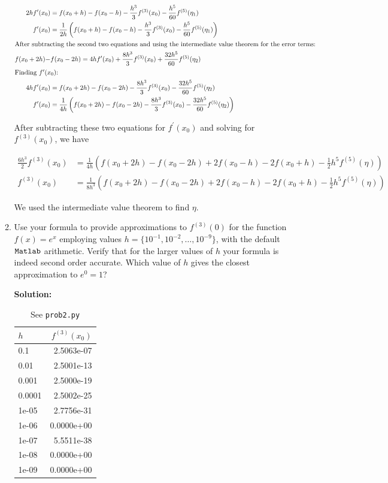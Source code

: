 \documentclass[12pt]{article}
\begin{document}
\begin{enumerate}
\begin{enumerate}
\begin{align*}
2hf^{\prime}(x_{0}) &= f(x_{0} + h) - f(x_{0} - h) - \frac{h^{3}}{3}f^{(3)}(x_{0}) - \frac{h^{5}}{60}f^{(5)}(\eta_{1})\\
f^{\prime}(x_{0}) &= \frac{1}{2h}\left( f(x_{0} + h) - f(x_{0} - h) - \frac{h^{3}}{3}f^{(3)}(x_{0}) - \frac{h^{5}}{60}f^{(5)}(\eta_{1})\right)\\
\intertext{After subtracting the second two equations and using the intermediate value theorem for the error terms:}
f(x_{0} + 2h) -& f(x_{0} - 2h) = 4hf^{\prime}(x_{0}) + \frac{8h^{3}}{3}f^{(3)}(x_{0}) + \frac{32h^{5}}{60}f^{(5)}(\eta_{2})\\
\intertext{Finding $f^{\prime}(x_{0})$:}
4hf^{\prime}(x_{0}) &= f(x_{0} + 2h) - f(x_{0} - 2h) - \frac{8h^{3}}{3}f^{(3)}(x_{0}) - \frac{32h^{5}}{60}f^{(5)}(\eta_{2})\\
f^{\prime}(x_{0}) &= \frac{1}{4h}\left( f(x_{0} + 2h) - f(x_{0} - 2h) - \frac{8h^{3}}{3}f^{(3)}(x_{0}) - \frac{32h^{5}}{60}f^{(5)}(\eta_{2})\right)
\end{align*}

After subtracting these two equations for $f^{\prime}(x_{0})$ and solving for $f^{(3)}(x_{0})$, we have

\begin{align*}
\frac{6h^{3}}{2}f^{(3)}(x_{0}) &= \frac{1}{4h}\left( f(x_{0} + 2h) - f(x_{0} - 2h) + 2f(x_{0} - h) - 2f(x_{0} + h) - \frac{1}{2}h^{5}f^{(5)}(\eta)\right)\\
f^{(3)}(x_{0}) &=\frac{1}{8h^{3}}\left( f(x_{0} + 2h) - f(x_{0} - 2h) + 2f(x_{0} - h) - 2f(x_{0} + h) - \frac{1}{2}h^{5}f^{(5)}(\eta)\right)
\end{align*}

We used the intermediate value theorem to find $\eta$. 

\item Use your formula to provide approximations to $f^{(3)}(0)$ for the function $f(x) = e^{x}$ employing values $h = \{ 10^{-1}, 10^{-2}, \ldots, 10^{-9}\}$, with the default ${\tt Matlab}$ arithmetic. Verify that for the larger values of $h$ your formula is indeed second order accurate. Which value of $h$ gives the closest approximation to $e^{0} = 1$?

{\bf Solution:}


\begin{table}[H]
\centering
\begin{tabular}{l r}
\hline \hline
$h$ & $f^{(3)}(x_{0})$\\
\hline
0.1 & 2.5063e-07\\
0.01 & 2.5001e-13\\
0.001 & 2.5000e-19\\
0.0001 & 2.5002e-25\\
1e-05 & 2.7756e-31\\
1e-06 & 0.0000e+00\\
1e-07 & 5.5511e-38\\
1e-08 & 0.0000e+00\\
1e-09 & 0.0000e+00\\
\hline
\end{tabular}
\caption{See {\tt prob2.py}}
\end{table}


\end{enumerate}
\end{enumerate}
\end{document}
